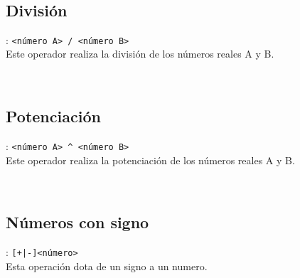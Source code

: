       \begin{fxcode}
         \\
      \end{fxcode}
      
      \subsection*{División}: \texttt{<número A>~/ <número B>}\\
      Este operador realiza la división de los números reales A y B.
      
      \begin{fxcode}
         \\
      \end{fxcode}
      
      \subsection*{Potenciación}: \texttt{<número A>~\^{} <número B>}\\
      Este operador realiza la potenciación de los números reales A y B.
      
      \begin{fxcode}
         \\
      \end{fxcode}
      
      \subsection*{Números con signo}: \texttt{[+|-]<número>}\\
      Esta operación dota de un signo a un numero.
      
      \begin{fxcode}
         \\
         \\
         \\
         \\
         \\
         \\
         \\
      \end{fxcode}
      
